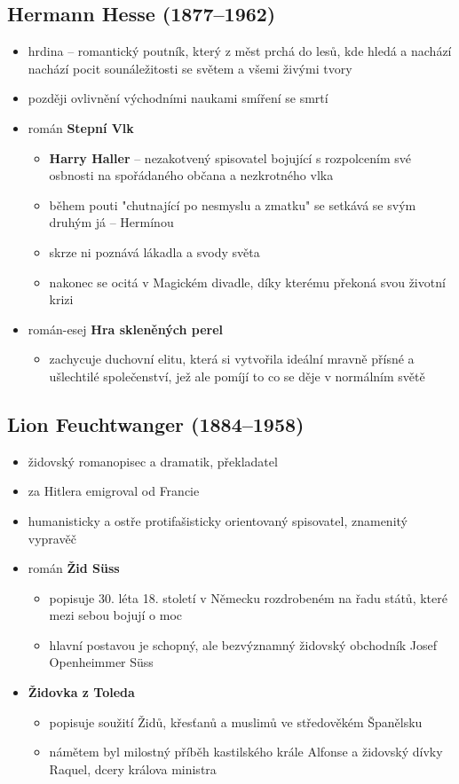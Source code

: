 \subsection{Hermann Hesse (1877--1962)}
\begin{itemize}
\item hrdina -- romantický poutník, který z měst prchá do lesů, kde hledá a nachází nachází pocit sounáležitosti se světem a všemi živými tvory
\item později ovlivnění východními naukami \ra smíření se smrtí
\item román \textbf{Stepní Vlk}
	\begin{itemize}
	\item \textbf{Harry Haller} -- nezakotvený spisovatel bojující s rozpolcením své osbnosti na spořádaného občana a nezkrotného vlka
	\item během pouti "chutnající po nesmyslu a zmatku" se setkává se svým druhým já -- Hermínou
	\item skrze ni poznává lákadla a svody světa
	\item nakonec se ocitá v Magickém divadle, díky kterému překoná svou životní krizi
	\end{itemize}
\item román-esej \textbf{Hra skleněných perel}
	\begin{itemize}
	\item zachycuje duchovní elitu, která si vytvořila ideální mravně přísné a ušlechtilé společenství, jež ale pomíjí to co se děje v normálním světě
	\end{itemize}
\end{itemize}

\subsection{Lion Feuchtwanger (1884--1958)}
\begin{itemize}
\item židovský romanopisec a dramatik, překladatel
\item za Hitlera emigroval od Francie
\item humanisticky a ostře protifašisticky orientovaný spisovatel, znamenitý vypravěč
\item román \textbf{Žid Süss}
	\begin{itemize}
	\item popisuje 30. léta 18. století v Německu rozdrobeném na řadu států, které mezi sebou bojují o moc
	\item hlavní postavou je schopný, ale bezvýznamný židovský obchodník Josef Openheimmer Süss
	\end{itemize}
\item \textbf{Židovka z Toleda}
	\begin{itemize}
	\item popisuje soužití Židů, křesťanů a muslimů ve středověkém Španělsku
	\item námětem byl milostný příběh kastilského krále Alfonse a židovský dívky Raquel, dcery králova ministra
	\end{itemize}
\end{itemize}



